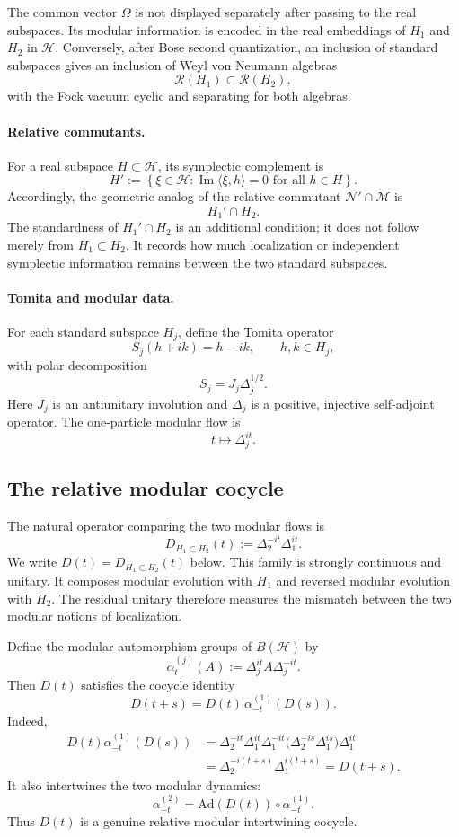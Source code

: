 \documentclass[a4paper,11pt]{article}
\theoremstyle{definition}
\newcommand{\cH}{\mathcal{H}}
\begin{document}
The common vector $\Omega$ is not displayed separately after passing to
the real subspaces.  Its modular information is encoded in the real
embeddings of $H_1$ and $H_2$ in $\cH$.  Conversely, after Bose second
quantization, an inclusion of standard subspaces gives an inclusion of
Weyl von Neumann algebras
\[
\mathcal{R}(H_1)\subset\mathcal{R}(H_2),
\]
with the Fock vacuum cyclic and separating for both algebras.

\paragraph{Relative commutants.}
For a real subspace $H\subset\cH$, its symplectic complement is
\[
H'
   :=\left\{\xi\in\cH:
      \operatorname{Im}\langle \xi,h\rangle=0
      \text{ for all }h\in H
      \right\}.
\]
Accordingly, the geometric analog of the relative commutant
$\mathcal{N}'\cap\mathcal{M}$ is
\[
\boxed{H_1'\cap H_2.}
\]
The standardness of $H_1'\cap H_2$ is an additional condition; it does
not follow merely from $H_1\subset H_2$.  It records how much localization
or independent symplectic information remains between the two standard
subspaces.

\paragraph{Tomita and modular data.}
For each standard subspace $H_j$, define the Tomita operator
\[
S_j(h+ik)=h-ik,
\qquad h,k\in H_j,
\]
with polar decomposition
\[
S_j=J_j\Delta_j^{1/2}.
\]
Here $J_j$ is an antiunitary involution and $\Delta_j$ is a positive,
injective self-adjoint operator.  The one-particle modular flow is
\[
t\longmapsto \Delta_j^{it}.
\]

\subsection*{The relative modular cocycle}

The natural operator comparing the two modular flows is
\[
\boxed{
   D_{H_1\subset H_2}(t):=\Delta_2^{-it}\Delta_1^{it}.
}
\]
We write $D(t)=D_{H_1\subset H_2}(t)$ below. This family is strongly
continuous and unitary. It composes modular evolution with $H_1$ and
reversed modular evolution with $H_2$.  The residual unitary therefore measures the mismatch between the
two modular notions of localization.

Define the modular automorphism groups of $B(\cH)$ by
\[
\alpha_t^{(j)}(A)
   :=\Delta_j^{it}A\Delta_j^{-it}.
\]
Then $D(t)$ satisfies the cocycle identity
\[
\boxed{
   D(t+s)=D(t)\,\alpha_{-t}^{(1)}(D(s)).
}
\]
Indeed,
\begin{align*}
 D(t)\alpha_{-t}^{(1)}(D(s))
 &=\Delta_2^{-it}\Delta_1^{it}
   \Delta_1^{-it}
   \bigl(\Delta_2^{-is}\Delta_1^{is}\bigr)
   \Delta_1^{it} \\
 &=\Delta_2^{-i(t+s)}\Delta_1^{i(t+s)}
 =D(t+s).
\end{align*}
It also intertwines the two modular dynamics:
\[
\boxed{
   \alpha_{-t}^{(2)}
   =\text{Ad}(D(t))\circ\alpha_{-t}^{(1)}.
}
\]
Thus $D(t)$ is a genuine relative modular intertwining cocycle.
\end{document}
